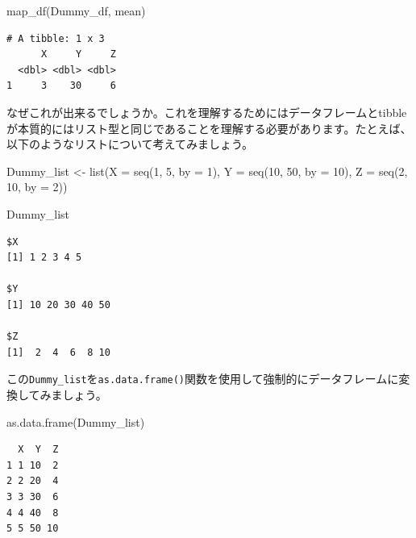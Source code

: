 \documentclass[
  a4paper,
  pandoc,
  ja=standard,
  jafont=haranoaji]{bxjsbook}
\newenvironment{Shaded}{\begin{snugshade}}{\end{snugshade}}
\newcommand{\AttributeTok}[1]{\textcolor[rgb]{0.00,0.48,0.65}{#1}}
\newcommand{\DecValTok}[1]{\textcolor[rgb]{0.68,0.00,0.00}{#1}}
\newcommand{\FunctionTok}[1]{\textcolor[rgb]{0.28,0.35,0.67}{#1}}
\newcommand{\NormalTok}[1]{\textcolor[rgb]{0.00,0.48,0.65}{#1}}
\newcommand{\OtherTok}[1]{\textcolor[rgb]{0.00,0.48,0.65}{#1}}
\begin{document}
\begin{Shaded}
\begin{Highlighting}[numbers=left,,]
\FunctionTok{map\_df}\NormalTok{(Dummy\_df, mean)}
\end{Highlighting}
\end{Shaded}

\begin{verbatim}
# A tibble: 1 x 3
      X     Y     Z
  <dbl> <dbl> <dbl>
1     3    30     6
\end{verbatim}

なぜこれが出来るでしょうか。これを理解するためにはデータフレームとtibbleが本質的にはリスト型と同じであることを理解する必要があります。たとえば、以下のようなリストについて考えてみましょう。

\begin{Shaded}
\begin{Highlighting}[numbers=left,,]
\NormalTok{Dummy\_list }\OtherTok{\textless{}{-}} \FunctionTok{list}\NormalTok{(}\AttributeTok{X =} \FunctionTok{seq}\NormalTok{(}\DecValTok{1}\NormalTok{,  }\DecValTok{5}\NormalTok{,  }\AttributeTok{by =} \DecValTok{1}\NormalTok{),}
                   \AttributeTok{Y =} \FunctionTok{seq}\NormalTok{(}\DecValTok{10}\NormalTok{, }\DecValTok{50}\NormalTok{, }\AttributeTok{by =} \DecValTok{10}\NormalTok{),}
                   \AttributeTok{Z =} \FunctionTok{seq}\NormalTok{(}\DecValTok{2}\NormalTok{,  }\DecValTok{10}\NormalTok{, }\AttributeTok{by =} \DecValTok{2}\NormalTok{))}

\NormalTok{Dummy\_list}
\end{Highlighting}
\end{Shaded}

\begin{verbatim}
$X
[1] 1 2 3 4 5

$Y
[1] 10 20 30 40 50

$Z
[1]  2  4  6  8 10
\end{verbatim}

この\texttt{Dummy\_list}を\texttt{as.data.frame()}関数を使用して強制的にデータフレームに変換してみましょう。

\begin{Shaded}
\begin{Highlighting}[numbers=left,,]
\FunctionTok{as.data.frame}\NormalTok{(Dummy\_list)}
\end{Highlighting}
\end{Shaded}

\begin{verbatim}
  X  Y  Z
1 1 10  2
2 2 20  4
3 3 30  6
4 4 40  8
5 5 50 10
\end{verbatim}
\end{document}
